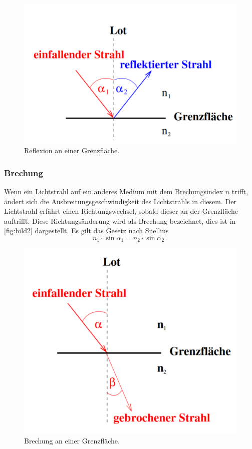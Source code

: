     \begin{figure}[H]
    \centering
	\includegraphics[width=0.6\linewidth]{content/grafik/reflexion.png}
	\caption{Reflexion an einer Grenzfläche. \cite{reflex}}
	\label{fig:bild1}
\end{figure}

\subsubsection{Brechung}
\label{sec:Brechung}
Wenn ein Lichtstrahl auf ein anderes Medium mit dem Brechungsindex $n$ trifft, ändert sich die Ausbreitungsgeschwindigkeit
des Lichtstrahls in diesem. Der Lichtstrahl erfährt einen Richtungswechsel, sobald dieser an der Grenzfläche auftrifft.
Diese Richtungsänderung wird als Brechung bezeichnet, dies ist in \autoref{fig:bild2} dargestellt. Es gilt das Gesetz nach Snellius
\begin{equation}
  n_1  \cdot \sin \alpha_1 = n_2 \cdot \sin \alpha_2\:.
\end{equation}

\begin{figure}[H]
    \centering
	\includegraphics[width=0.6\linewidth]{content/grafik/brechung.png}
	\caption{Brechung an einer Grenzfläche. \cite{reflex}}
	\label{fig:bild2}
\end{figure}

